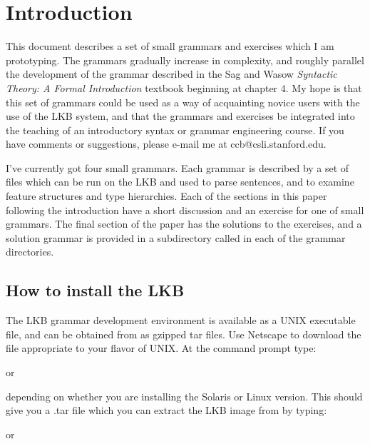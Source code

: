 

\section{Introduction}

This document describes a set of small grammars and exercises which I am prototyping.  The grammars gradually increase in complexity, and roughly parallel the development of the grammar described in the Sag and Wasow \emph{Syntactic Theory: A Formal Introduction} textbook beginning at chapter 4.  My hope is that this set of grammars could be used as a way of acquainting novice users with the use of the LKB system, and that the grammars and exercises be integrated into the teaching of an introductory syntax or grammar engineering course.  If you have comments or suggestions, please e-mail me at ccb@csli.stanford.edu. 

I've currently got four small grammars.  Each grammar is described by a set of files which can be run on the LKB and used to parse sentences, and to examine feature structures and type hierarchies.  Each of the sections in this paper following the introduction have a short discussion and an exercise for one of small grammars.  The final section of the paper has the solutions to the exercises, and a solution grammar is provided in a subdirectory called  in each of the grammar directories.


\subsection{How to install the LKB}

The LKB grammar development environment is available as a UNIX executable file, and can be obtained from  as gzipped tar files.  Use Netscape to download the file appropriate to your flavor of UNIX.  At the command prompt type:


\noindent or


\noindent depending on whether you are installing the Solaris or Linux version.  This should give you a .tar file which you can extract the LKB image from by typing:


\noindent or

